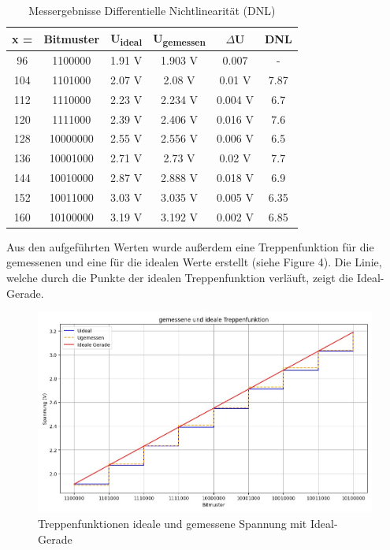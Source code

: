 \documentclass[a4paper,12pt]{article}
\begin{document}
\begin{table}[H]
    \centering
    \begin{tabular}{|c|c|c|c|c|c|}
        \hline
        x = & Bitmuster & U\textsubscript{ideal} & U\textsubscript{gemessen} & $\Delta$U & DNL\\
        \hline
        96 & 1100000 & 	1.91 V & 1.903 V & 0.007 & -\\
        104 & 1101000 & 2.07 V & 2.08 V & 0.01 V & 7.87\\
        112 & 1110000 & 2.23 V & 2.234 V & 0.004 V & 6.7\\
        120 & 1111000 & 2.39 V & 2.406 V & 0.016 V & 7.6\\
        128 & 10000000 & 2.55 V & 2.556 V & 0.006 V & 6.5\\
        136 & 10001000 & 2.71 V & 2.73 V & 0.02 V & 7.7\\
        144 & 10010000 & 2.87 V & 2.888 V & 0.018 V & 6.9\\
        152 & 10011000 & 3.03 V & 3.035 V & 0.005 V & 6.35\\
        160 & 10100000 & 3.19 V & 3.192 V & 0.002 V & 6.85\\
        \hline
    \end{tabular}
    \caption{Messergebnisse Differentielle Nichtlinearität (DNL)}
\end{table}

\noindent Aus den aufgeführten Werten wurde außerdem eine Treppenfunktion für die gemessenen und eine für die idealen Werte erstellt (siehe Figure 4). Die Linie, welche durch die Punkte der idealen Treppenfunktion verläuft, zeigt die Ideal-Gerade.\\

\begin{figure}[H]
    \centering
\includegraphics[width=1.0\textwidth]{../Quellen/Labor1/Versuch1/Treppenfunktion1.png}
    \caption{Treppenfunktionen ideale und gemessene Spannung mit Ideal-Gerade}
\end{figure}
\end{document}

